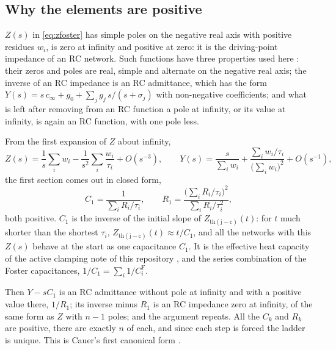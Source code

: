 \documentclass[10pt,a4paper]{scrartcl}
\newcommand{\Zjc}{Z_\mathrm{th(j-c)}}
\begin{document}
\subsection{Why the elements are positive}
\label{sec:positive}
$Z(s)$ in \eqref{eq:zfoster} has simple poles on the negative real axis with positive residues $w_i$, is zero at infinity and positive at zero: it is the driving-point impedance of an RC network. Such functions have three properties used here \cite{foster1924,cauer1926,guillemin1957}: their zeros and poles are real, simple and alternate on the negative real axis; the inverse of an RC impedance is an RC admittance, which has the form $Y(s) = s\,c_\infty + g_0 + \sum_j g_j\, s/(s+\sigma_j)$ with non-negative coefficients; and what is left after removing from an RC function a pole at infinity, or its value at infinity, is again an RC function, with one pole less.

From the first expansion of $Z$ about infinity,
\begin{equation}
Z(s) = \frac{1}{s}\sum_i w_i - \frac{1}{s^2}\sum_i \frac{w_i}{\tau_i} + O\!\left(s^{-3}\right) , \qquad
Y(s) = \frac{s}{\sum_i w_i} + \frac{\sum_i w_i/\tau_i}{\bigl(\sum_i w_i\bigr)^2} + O\!\left(s^{-1}\right) ,
\end{equation}
the first section comes out in closed form,
\begin{equation}
C_1 = \frac{1}{\sum_i R_i/\tau_i} , \qquad R_1 = \frac{\bigl(\sum_i R_i/\tau_i\bigr)^2}{\sum_i R_i/\tau_i^2} ,
\label{eq:first}
\end{equation}
both positive. $C_1$ is the inverse of the initial slope of $\Zjc(t)$: for $t$ much shorter than the shortest $\tau_i$, $\Zjc(t) \approx t/C_1$, and all the networks with this $Z(s)$ behave at the start as one capacitance $C_1$. It is the effective heat capacity of the active clamping note of this repository \cite{activeclamping}, and the series combination of the Foster capacitances, $1/C_1 = \sum_i 1/C_i^\mathrm{F}$.

Then $Y - sC_1$ is an RC admittance without pole at infinity and with a positive value there, $1/R_1$; its inverse minus $R_1$ is an RC impedance zero at infinity, of the same form as $Z$ with $n-1$ poles; and the argument repeats. All the $C_k$ and $R_k$ are positive, there are exactly $n$ of each, and since each step is forced the ladder is unique. This is Cauer's first canonical form \cite{cauer1926}.
\end{document}
